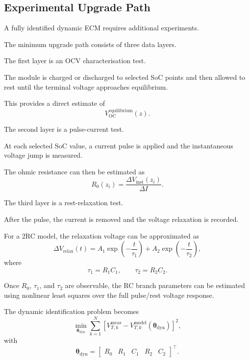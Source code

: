 \documentclass[a4paper,12pt]{article}
\newcommand{\vect}[1]{\bm{#1}}
\begin{document}
\subsection{Experimental Upgrade Path}

A fully identified dynamic ECM requires additional experiments.

The minimum upgrade path consists of three data layers.

The first layer is an OCV characterisation test.

The module is charged or discharged to selected SoC points and then allowed to rest until the terminal voltage approaches equilibrium.

This provides a direct estimate of
\begin{equation}
V_{\mathrm{OC}}^{\mathrm{equilibrium}}(z).
\label{eq:interp_true_ocv}
\end{equation}

The second layer is a pulse-current test.

At each selected SoC value, a current pulse is applied and the instantaneous voltage jump is measured.

The ohmic resistance can then be estimated as
\begin{equation}
R_0(z_i)
=
\frac{\Delta V_{\mathrm{inst}}(z_i)}{\Delta I}.
\label{eq:interp_r0_from_pulse}
\end{equation}

The third layer is a rest-relaxation test.

After the pulse, the current is removed and the voltage relaxation is recorded.

For a 2RC model, the relaxation voltage can be approximated as
\begin{equation}
\Delta V_{\mathrm{relax}}(t)
=
A_1\exp\left(-\frac{t}{\tau_1}\right)
+
A_2\exp\left(-\frac{t}{\tau_2}\right),
\label{eq:interp_relaxation_two_exponentials}
\end{equation}
where
\begin{equation}
\tau_1=R_1C_1,
\qquad
\tau_2=R_2C_2.
\label{eq:interp_time_constants_from_relaxation}
\end{equation}

Once \(R_0\), \(\tau_1\), and \(\tau_2\) are observable, the RC branch parameters can be estimated using nonlinear least squares over the full pulse/rest voltage response.

The dynamic identification problem becomes
\begin{equation}
\min_{\vect{\theta}_{\mathrm{dyn}}}
\sum_{k=1}^{N}
\left[
V_{T,k}^{\mathrm{meas}}
-
V_{T,k}^{\mathrm{model}}
\left(
\vect{\theta}_{\mathrm{dyn}}
\right)
\right]^2,
\label{eq:interp_dynamic_upgrade_objective}
\end{equation}
with
\begin{equation}
\vect{\theta}_{\mathrm{dyn}}
=
\begin{bmatrix}
R_0 & R_1 & C_1 & R_2 & C_2
\end{bmatrix}^{\top}.
\label{eq:interp_dynamic_upgrade_theta}
\end{equation}
\end{document}

